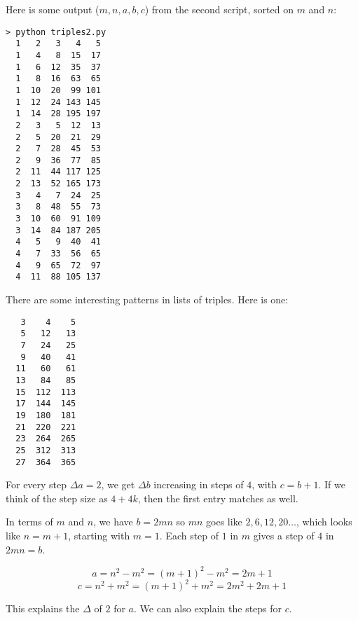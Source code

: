 \documentclass[11pt, oneside]{article}
\begin{document}
Here is some output ($m,n,a,b,c$) from the second script, sorted on $m$ and $n$:

\begin{verbatim}
> python triples2.py
  1   2   3   4   5 
  1   4   8  15  17 
  1   6  12  35  37 
  1   8  16  63  65 
  1  10  20  99 101 
  1  12  24 143 145 
  1  14  28 195 197 
  2   3   5  12  13 
  2   5  20  21  29 
  2   7  28  45  53 
  2   9  36  77  85 
  2  11  44 117 125 
  2  13  52 165 173 
  3   4   7  24  25 
  3   8  48  55  73 
  3  10  60  91 109 
  3  14  84 187 205 
  4   5   9  40  41 
  4   7  33  56  65 
  4   9  65  72  97 
  4  11  88 105 137 

\end{verbatim}

There are some interesting patterns in lists of triples.  Here is one:

\begin{verbatim}
   3    4    5 
   5   12   13 
   7   24   25 
   9   40   41 
  11   60   61 
  13   84   85 
  15  112  113 
  17  144  145 
  19  180  181 
  21  220  221 
  23  264  265 
  25  312  313 
  27  364  365 
\end{verbatim}

For every step $\Delta a = 2$, we get $\Delta b$ increasing in steps of $4$, with $c = b + 1$.  If we think of the step size as $4 + 4k$, then the first entry matches as well.

In terms of $m$ and $n$, we have $b = 2mn$ so $mn$ goes like $2, 6, 12, 20 \dots$, which looks like $n = m+1$, starting with $m=1$.  Each step of $1$ in $m$ gives a step of $4$ in $2mn = b$.

\[ a = n^2 - m^2 = (m+1)^2 - m^2 = 2m + 1 \]
\[ c = n^2 + m^2 = (m+1)^2 + m^2 = 2m^2 + 2m + 1 \]

This explains the $\Delta$ of $2$ for $a$.  We can also explain the steps for $c$.
\end{document}
